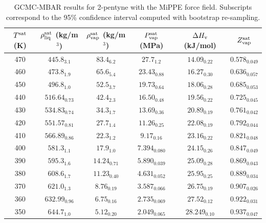 \documentclass[journal=jctc,manuscript=article]{achemso}
\begin{document}
\begin{table}[htb!]
	\caption{GCMC-MBAR results for 2-pentyne with the MiPPE force field. Subscripts correspond to the 95\% confidence interval computed with bootstrap re-sampling.}
	\begin{center}
		\begin{tabular}{|c|c|c|c|c|c|}
			\hline
			$T^{\rm sat}$ (K) & $\rho_{\rm liq}^{\rm sat}$ (kg/m$^3$) & $\rho_{\rm vap}^{\rm sat}$ (kg/m$^3$) & $P_{\rm vap}^{\rm sat}$ (MPa) & $\Delta H_{\rm v}$ (kJ/mol) & $Z_{\rm vap}^{\rm sat}$ \\ \hline
			470 & $445.8_{3.1}$ & $83.4_{6.2}$ & $27.7_{1.2}$ & $14.09_{0.22}$ & $0.578_{0.049}$ \\
			460 & $473.8_{1.9}$ & $65.6_{5.4}$ & $23.43_{0.88}$ & $16.27_{0.30}$ & $0.636_{0.057}$ \\
			450 & $496.8_{1.0}$ & $52.5_{3.7}$ & $19.73_{0.64}$ & $18.06_{0.28}$ & $0.685_{0.053}$ \\
			440 & $516.64_{0.73}$ & $42.4_{2.3}$ & $16.50_{0.48}$ & $19.56_{0.22}$ & $0.725_{0.045}$ \\
			430 & $534.83_{0.74}$ & $34.3_{1.7}$ & $13.69_{0.36}$ & $20.89_{0.19}$ & $0.761_{0.042}$ \\
			420 & $551.57_{0.81}$ & $27.7_{1.4}$ & $11.26_{0.25}$ & $22.08_{0.19}$ & $0.792_{0.044}$ \\
			410 & $566.89_{0.86}$ & $22.3_{1.2}$ & $9.17_{0.16}$ & $23.16_{0.22}$ & $0.821_{0.048}$ \\
			400 & $581.3_{1.1}$ & $17.9_{1.0}$ & $7.394_{0.080}$ & $24.15_{0.26}$ & $0.847_{0.049}$ \\
			390 & $595.3_{1.6}$ & $14.24_{0.71}$ & $5.890_{0.039}$ & $25.09_{0.28}$ & $0.869_{0.043}$ \\
			380 & $608.6_{1.7}$ & $11.23_{0.40}$ & $4.631_{0.052}$ & $25.95_{0.25}$ & $0.889_{0.034}$ \\
			370 & $621.0_{1.3}$ & $8.76_{0.19}$ & $3.587_{0.066}$ & $26.75_{0.19}$ & $0.907_{0.026}$ \\
			360 & $632.99_{0.96}$ & $6.75_{0.16}$ & $2.735_{0.069}$ & $27.52_{0.12}$ & $0.922_{0.031}$ \\
			350 & $644.7_{1.0}$ & $5.12_{0.20}$ & $2.049_{0.065}$ & $28.249_{0.10}$ & $0.937_{0.047}$ \\
			\hline
		\end{tabular}
	\end{center}
\end{table}
\end{document}

